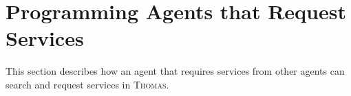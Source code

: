 \section{Programming Agents that Request Services}
This section describes how an agent that requires services from other agents can search and request services in \textsc{Thomas}.





